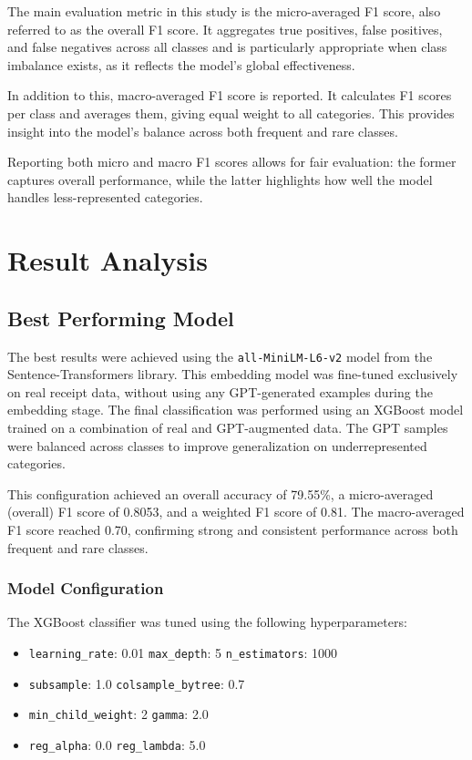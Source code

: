 \documentclass{SGGW-thesis-EN}
\begin{document}
The main evaluation metric in this study is the micro-averaged F1 score, also referred to as the overall F1 score. It aggregates true positives,  
false positives, and false negatives across all classes and is particularly appropriate when class imbalance exists, as it reflects the model’s  
global effectiveness.

In addition to this, macro-averaged F1 score is reported. It calculates F1 scores per class and averages them, giving equal weight to all  
categories. This provides insight into the model’s balance across both frequent and rare classes.

Reporting both micro and macro F1 scores allows for fair evaluation: the former captures overall performance, while the latter highlights how  
well the model handles less-represented categories.


\section{Result Analysis}
\subsection{Best Performing Model}

The best results were achieved using the \texttt{all-MiniLM-L6-v2} model from the Sentence-Transformers library. This embedding model was  
fine-tuned exclusively on real receipt data, without using any GPT-generated examples during the embedding stage. The final classification was  
performed using an XGBoost model trained on a combination of real and GPT-augmented data. The GPT samples were balanced across classes to improve  
generalization on underrepresented categories.

This configuration achieved an overall accuracy of 79.55\%, a micro-averaged (overall) F1 score of 0.8053, and a weighted F1 score of 0.81.  
The macro-averaged F1 score reached 0.70, confirming strong and consistent performance across both frequent and rare classes.

\subsubsection*{Model Configuration}

The XGBoost classifier was tuned using the following hyperparameters:

\begin{itemize}
  \item \texttt{learning\_rate}: 0.01 \quad \texttt{max\_depth}: 5 \quad \texttt{n\_estimators}: 1000
  \item \texttt{subsample}: 1.0 \quad \texttt{colsample\_bytree}: 0.7
  \item \texttt{min\_child\_weight}: 2 \quad \texttt{gamma}: 2.0
  \item \texttt{reg\_alpha}: 0.0 \quad \texttt{reg\_lambda}: 5.0
\end{itemize}
\end{document}

